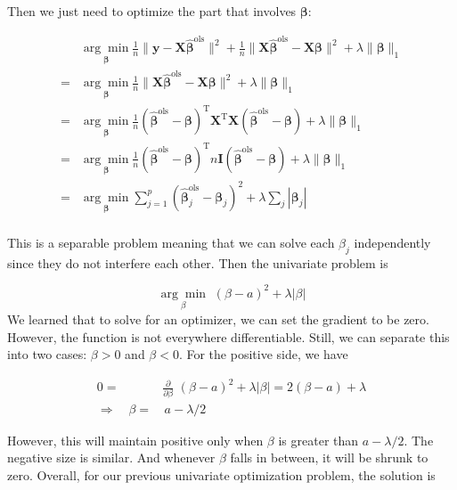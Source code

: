 \documentclass[
]{book}
\theoremstyle{definition}
\theoremstyle{definition}
\theoremstyle{definition}
\theoremstyle{definition}
\theoremstyle{remark}
\begin{document}
Then we just need to optimize the part that involves \(\boldsymbol \beta\):

\begin{align}
&\underset{\boldsymbol \beta}{\arg\min} \frac{1}{n}\lVert \mathbf{y}- \mathbf{X}\widehat{\boldsymbol \beta}^\text{ols} \rVert^2 + \frac{1}{n} \lVert \mathbf{X}\widehat{\boldsymbol \beta}^\text{ols} - \mathbf{X}\boldsymbol \beta\rVert^2 + \lambda \lVert\boldsymbol \beta\rVert_1\\
=&\underset{\boldsymbol \beta}{\arg\min} \frac{1}{n} \lVert \mathbf{X}\widehat{\boldsymbol \beta}^\text{ols} - \mathbf{X}\boldsymbol \beta\rVert^2 + \lambda \lVert\boldsymbol \beta\rVert_1\\
=&\underset{\boldsymbol \beta}{\arg\min} \frac{1}{n} (\widehat{\boldsymbol \beta}^\text{ols} - \boldsymbol \beta)^\text{T}\mathbf{X}^\text{T}\mathbf{X}(\widehat{\boldsymbol \beta}^\text{ols} - \boldsymbol \beta)  + \lambda \lVert\boldsymbol \beta\rVert_1\\
=&\underset{\boldsymbol \beta}{\arg\min} \frac{1}{n} (\widehat{\boldsymbol \beta}^\text{ols} - \boldsymbol \beta)^\text{T}n \mathbf{I}(\widehat{\boldsymbol \beta}^\text{ols} - \boldsymbol \beta)  + \lambda \lVert\boldsymbol \beta\rVert_1\\
=&\underset{\boldsymbol \beta}{\arg\min} \sum_{j = 1}^p (\widehat{\boldsymbol \beta}^\text{ols}_j - \boldsymbol \beta_j )^2 + \lambda \sum_j |\boldsymbol \beta_j|\\
\end{align}

This is a separable problem meaning that we can solve each \(\beta_j\) independently since they do not interfere each other. Then the univariate problem is

\[\underset{\beta}{\arg\min} \,\, (\beta - a)^2 + \lambda |\beta|\]
We learned that to solve for an optimizer, we can set the gradient to be zero. However, the function is not everywhere differentiable. Still, we can separate this into two cases: \(\beta > 0\) and \(\beta < 0\). For the positive side, we have

\begin{align}
0 =& \frac{\partial}{\partial \beta} \,\, (\beta - a)^2 + \lambda |\beta| = 2 (\beta - a) + \lambda \\
\Longrightarrow \quad \beta =&\, a - \lambda/2
\end{align}

However, this will maintain positive only when \(\beta\) is greater than \(a - \lambda/2\). The negative size is similar. And whenever \(\beta\) falls in between, it will be shrunk to zero. Overall, for our previous univariate optimization problem, the solution is
\end{document}
